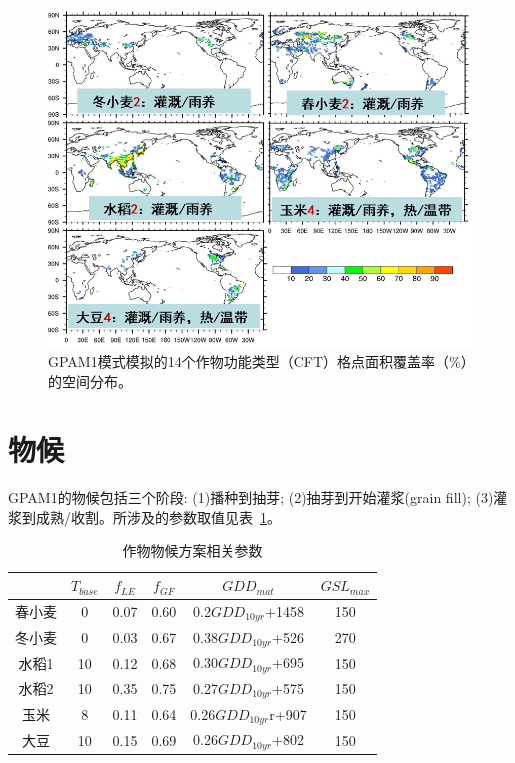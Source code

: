 {
\begin{figure}[htbp]
\centering
\includegraphics[scale=0.9]{Figures/作物模式/GPAM1模式模拟的14个作物功能类型格点面积覆盖率空间分布.png}
\caption{GPAM1模式模拟的14个作物功能类型（CFT）格点面积覆盖率（\%）的空间分布。}
\label{fig:作物功能类型覆盖率的空间分布}
\end{figure}
}

\section{物候}
GPAM1的物候包括三个阶段: (1)播种到抽芽; (2)抽芽到开始灌浆(grain fill); (3)灌浆到成熟/收割。所涉及的参数取值见表~\ref{tab:作物物候方案相关参数}。

\begin{table}[htbp]
  \centering
  \caption{作物物候方案相关参数}
  \label{tab:作物物候方案相关参数}
\begin{tabular}{@{}cccccc@{}}
\toprule
    & $T_{base}$ & $f_{LE}$  & $f_{GF}$  & $GDD_{mat}$          & $GSL_{max}$ \\ \midrule
春小麦 & 0     & 0.07 & 0.60 & 0.2$GDD_{10yr}$+1458 & 150    \\
冬小麦 & 0     & 0.03 & 0.67 & 0.38$GDD_{10yr}$+526 & 270    \\
水稻1 & 10    & 0.12 & 0.68 & 0.30$GDD_{10yr}$+695 & 150    \\
水稻2 & 10    & 0.35 & 0.75 & 0.27$GDD_{10yr}$+575 & 150    \\
玉米  & 8     & 0.11 & 0.64 & 0.26$GDD_{10yr}$r+907 & 150    \\
大豆  & 10    & 0.15 & 0.69 & 0.26$GDD_{10yr}$+802 & 150    \\ \bottomrule
\end{tabular}
\end{table}

